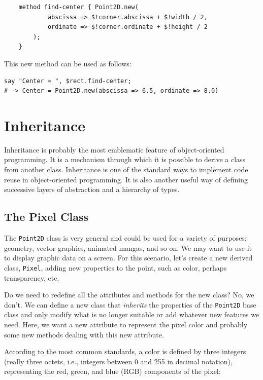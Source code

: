 \begin{verbatim}
    method find-center { Point2D.new(
            abscissa => $!corner.abscissa + $!width / 2, 
            ordinate => $!corner.ordinate + $!height / 2
        );
    }
\end{verbatim}
%
This new method can be used as follows:

\begin{verbatim}
say "Center = ", $rect.find-center;
# -> Center = Point2D.new(abscissa => 6.5, ordinate => 8.0)
\end{verbatim}
%

\section{Inheritance}


Inheritance is probably the most emblematic feature of 
object-oriented programming. It is a mechanism through which it 
is possible to derive a class from another class. Inheritance is 
one of the standard ways to implement code reuse in 
object-oriented programming. It is also another useful way of 
defining successive layers of abstraction and a hierarchy of 
types.

\subsection{The Pixel Class}

The {\tt Point2D} class is very general and could be used for 
a variety of purposes: geometry, vector graphics, animated mangas, 
and so on. We may want to use it to display graphic data on a 
screen. For this scenario, let's create a new derived class, 
{\tt Pixel}, adding new properties to the point, such as color, 
perhaps transparency, etc. 

Do we need to redefine all the attributes and methods for 
the new class? No, we don't. We can define a new class that 
\emph{inherits} the properties of the {\tt Point2D} base class 
and only modify what is no longer suitable or add whatever 
new features we need. Here, we want a new attribute to represent 
the pixel color and probably some new methods dealing with this 
new attribute.

According to the most common standards, a color is defined 
by three integers (really three octets, i.e., integers 
between 0 and 255 in decimal notation), representing the red, 
green, and blue (RGB) components of the pixel:

